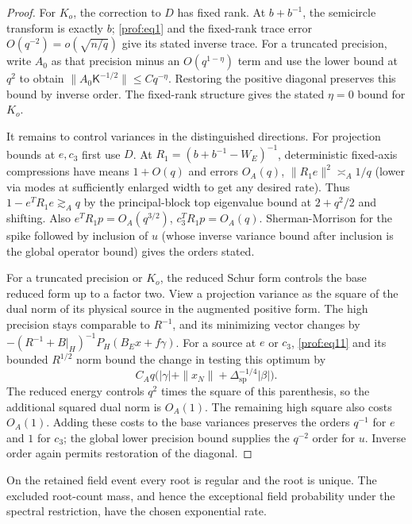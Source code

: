 \begin{proof}
For $K_o$, the correction to $D$ has fixed rank. At
$b+b^{-1}$, the semicircle transform is exactly $b$;
\eqref{prof:eq1} and the fixed-rank trace error $O(q^{-2})
=o(\sqrt{n/q})$ give its stated inverse trace. For a truncated
precision, write $A_0$ as that precision minus an
$O(q^{1-\eta})$ term and use the lower bound at $q^2$ to obtain
$\|A_0\mathsf K^{-1/2}\|\le Cq^{-\eta}$. Restoring the positive
diagonal preserves this bound by inverse order. The fixed-rank
structure gives the stated $\eta=0$ bound for $K_o$.

It remains to control variances in the distinguished directions. For
projection bounds at \(e,c_3\) first use \(D\). At \(R_1=(b+b^{-1}-W_E)^{-1}\), deterministic fixed-axis compressions have means \(1+O(q)\) and errors \(O_A(q)\), \(\|R_1 e\|^2\asymp_A 1/q\) (lower via modes at sufficiently enlarged width to get any desired rate). Thus \(1-e^T R_1 e\gtrsim_A q\) by the principal-block top eigenvalue bound at \(2+q^2/2\) and shifting. Also \(e^T R_1 p=O_A(q^{3/2})\), \(c_3^TR_1 p=O_A(q)\). Sherman-Morrison for the spike followed by inclusion of \(u\) (whose inverse variance bound after inclusion is the global operator bound) gives the orders stated.

For a truncated precision or $K_o$, the reduced Schur form controls
the base reduced form up to a factor two. View a projection variance
as the square of the dual norm of its physical source in the augmented
positive form. The high precision stays comparable to $R^{-1}$, and
its minimizing vector changes by
$-(R^{-1}+B|_H)^{-1}P_H(B_Ex+f\gamma)$.
For a source at $e$ or $c_3$, \eqref{prof:eq11} and its bounded
$R^{1/2}$ norm bound the change in testing this optimum by
\[
 C_Aq\bigl(|\gamma|+\|x_N\|+
                    \Delta_{\mathrm{sp}}^{-1/4}|\beta|\bigr).
\]
The reduced energy controls $q^2$ times the square of this
parenthesis, so the additional squared dual norm is $O_A(1)$.
The remaining high square also costs $O_A(1)$. Adding these costs to
the base variances preserves the orders $q^{-1}$ for $e$ and $1$ for
$c_3$; the global lower precision bound supplies the $q^{-2}$ order
for $u$. Inverse order again permits restoration of the diagonal.

\end{proof}

\begin{corollary}
\label{prof:unique-root}
On the retained field event every root is regular and the root is unique.
The excluded root-count mass, and hence the exceptional field probability
under the spectral restriction, have the chosen exponential rate.
\end{corollary}

